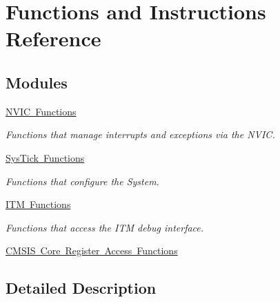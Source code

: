 \hypertarget{group___c_m_s_i_s___core___function_interface}{}\section{Functions and Instructions Reference}
\label{group___c_m_s_i_s___core___function_interface}
\subsection*{Modules}
\begin{DoxyCompactItemize}
\item 
\mbox{\hyperlink{group___c_m_s_i_s___core___n_v_i_c_functions}{N\+V\+I\+C Functions}}
\begin{DoxyCompactList}\small\item\em Functions that manage interrupts and exceptions via the N\+V\+IC. \end{DoxyCompactList}\item 
\mbox{\hyperlink{group___c_m_s_i_s___core___sys_tick_functions}{Sys\+Tick Functions}}
\begin{DoxyCompactList}\small\item\em Functions that configure the System. \end{DoxyCompactList}\item 
\mbox{\hyperlink{group___c_m_s_i_s__core___debug_functions}{I\+T\+M Functions}}
\begin{DoxyCompactList}\small\item\em Functions that access the I\+TM debug interface. \end{DoxyCompactList}\item 
\mbox{\hyperlink{group___c_m_s_i_s___core___reg_acc_functions}{C\+M\+S\+I\+S Core Register Access Functions}}
\end{DoxyCompactItemize}


\subsection{Detailed Description}
